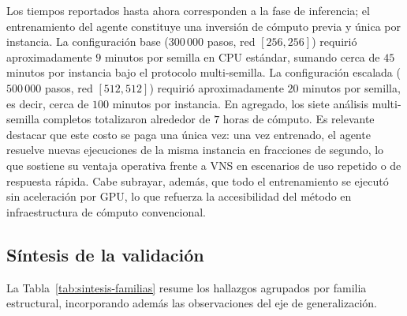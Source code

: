 Los tiempos reportados hasta ahora corresponden a la fase de inferencia; el entrenamiento del agente constituye una inversión de cómputo previa y única por instancia. La configuración base ($300\,000$ pasos, red $[256,256]$) requirió aproximadamente $9$ minutos por semilla en CPU estándar, sumando cerca de $45$ minutos por instancia bajo el protocolo multi-semilla. La configuración escalada ($500\,000$ pasos, red $[512,512]$) requirió aproximadamente $20$ minutos por semilla, es decir, cerca de $100$ minutos por instancia. En agregado, los siete análisis multi-semilla completos totalizaron alrededor de $7$ horas de cómputo. Es relevante destacar que este costo se paga una única vez: una vez entrenado, el agente resuelve nuevas ejecuciones de la misma instancia en fracciones de segundo, lo que sostiene su ventaja operativa frente a VNS en escenarios de uso repetido o de respuesta rápida. Cabe subrayar, además, que todo el entrenamiento se ejecutó sin aceleración por GPU, lo que refuerza la accesibilidad del método en infraestructura de cómputo convencional. 


\subsection{Síntesis de la validación} \label{sec:sintesis-validacion}
La Tabla~\ref{tab:sintesis-familias} resume los hallazgos agrupados por familia estructural, incorporando además las observaciones del eje de generalización.

